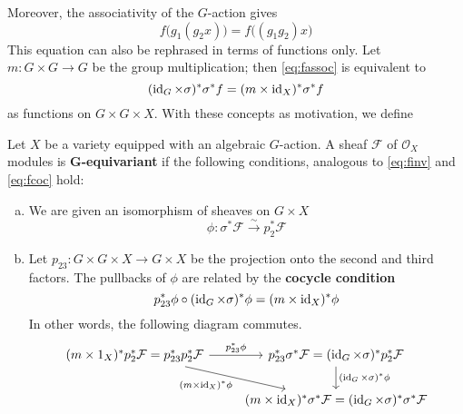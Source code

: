 Moreover, the associativity of the $G$-action gives
\begin{equation}
\label{eq:fassoc}
f\big(g_1(g_2x)\big) = f\big((g_1g_2)x\big)
\end{equation}
This equation can also be rephrased in terms of functions only. Let $m: G\times G \to G$
be the group multiplication; then \ref{eq:fassoc} is equivalent to
\begin{equation}
\label{eq:fcoc}
(\operatorname{id}_G \times \sigma)^* \sigma^* f = (m \times \operatorname{id}_X)^* \sigma^* f
\end{equation}
as functions on $G \times G \times X$. With these concepts as motivation, we define

\begin{definition}
Let $X$ be a variety equipped with an algebraic $G$-action. A sheaf $\mathcal{F}$ of 
$\mathcal{O}_X$ modules is \textbf{G-equivariant} if the following conditions, analogous 
to \ref{eq:finv} and \ref{eq:fcoc} hold:
\begin{enumerate}[(a)]
\item We are given an isomorphism of sheaves on $G\times X$
\[	\phi : \sigma^* \mathcal{F} \overset{\sim}{\to} p_2^* \mathcal{F}	\]
\item Let $p_{23}:G\times G \times X \to G\times X$ be the projection onto the second
and third factors. The pullbacks of $\phi$ are related by the \textbf{cocycle condition}
\[	p_{23}^* \phi \circ (\operatorname{id}_G \times \sigma)^* \phi = (m \times \operatorname{id}_X)^* \phi	\]
In other words, the following diagram commutes.
\[
\begin{tikzcd}
(m\times 1_X)^*p_2^* \mathcal{F} = p_{23}^* p_2^*\mathcal{F}\arrow{r}{p_{23}^*\phi}\arrow[swap]{dr}{(m\times \id_X)^*\phi}
& p_{23}^* \sigma^* \mathcal{F} = (\id_G \times \sigma)^*p_2^* \mathcal{F}\arrow{d}{(\id_G \times \sigma)^*\phi} \\
& (m\times \id_X)^*\sigma^* \mathcal{F} = (\id_G \times \sigma)^*\sigma^*\mathcal{F}
\end{tikzcd}
\]
\end{enumerate}
\end{definition}

